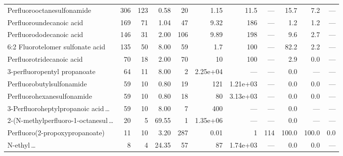 \begin{table}[p]
\begin{tabular}{@{}>{\raggedright\arraybackslash}p{37mm} rrr r rrr rrr@{}}
\textsf{Perfluorooctanesulfonamide} & 306 & 123 & 0.58 & 20 & 1.15 & 11.5 & --- & 15.7 & 7.2 & ---\\
\textsf{Perfluoroundecanoic acid} & 169 & 71 & 1.04 & 47 & 9.32 & 186 & --- & 1.2 & 1.2 & ---\\
\textsf{Perfluorododecanoic acid} & 146 & 31 & 2.00 & 106 & 9.89 & 198 & --- & 9.6 & 2.7 & ---\\
\textsf{6:2 Fluorotelomer sulfonate acid} & 135 & 50 & 8.00 & 59 & 1.7 & 100 & --- & 82.2 & 2.2 & ---\\
\textsf{Perfluorotridecanoic acid} & 70 & 18 & 2.00 & 70 & 10 & 100 & --- & 2.9 & 0.0 & ---\\
\textsf{3-perfluoropentyl propanoate} & 64 & 11 & 8.00 & 2 & 2.25e+04 & --- & --- & 0.0 & --- & ---\\
\textsf{Perfluorobutylsulfonamide} & 59 & 10 & 0.80 & 19 & 121 & 1.21e+03 & --- & 0.0 & 0.0 & ---\\
\textsf{Perfluorohexanesulfonamide} & 59 & 10 & 0.80 & 18 & 80 & 3.13e+03 & --- & 0.0 & 0.0 & ---\\
\textsf{3-Perfluoroheptylpropanoic acid\,\ldots} & 59 & 10 & 8.00 & 7 & 400 & --- & --- & 0.0 & --- & ---\\
\textsf{2-(N-methylperfluoro-1-octanesul\,\ldots} & 20 & 5 & 69.55 & 1 & 1.35e+06 & --- & --- & 0.0 & --- & ---\\
\textsf{Perfluoro(2-propoxypropanoate)} & 11 & 10 & 3.20 & 287 & 0.01 & 1 & 114 & 100.0 & 100.0 & 0.0\\
\textsf{N-ethyl\,\ldots} & 8 & 4 & 24.35 & 57 & 87 & 1.74e+03 & --- & 0.0 & 0.0 & ---\\
\bottomrule\end{tabular}\end{table}
